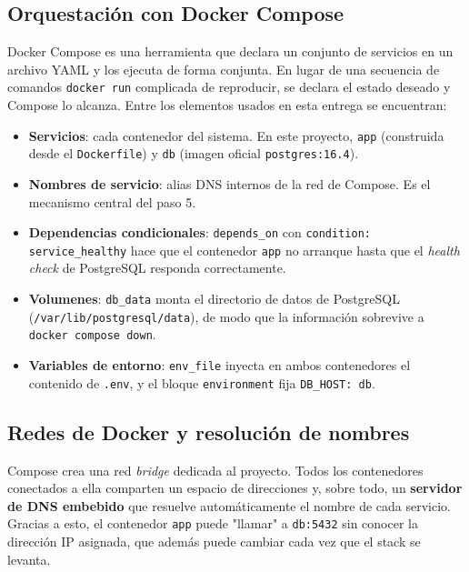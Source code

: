 \documentclass[12pt,a4paper]{article}
\begin{document}
\subsection{Orquestaci\'on con Docker Compose}

Docker Compose es una herramienta que declara un conjunto de servicios en un archivo YAML y
los ejecuta de forma conjunta. En lugar de una secuencia de comandos \texttt{docker run}
complicada de reproducir, se declara el estado deseado y Compose lo alcanza. Entre los
elementos usados en esta entrega se encuentran:

\begin{itemize}
  \item \textbf{Servicios}: cada contenedor del sistema. En este proyecto, \texttt{app}
        (construida desde el \texttt{Dockerfile}) y \texttt{db} (imagen oficial
        \texttt{postgres:16.4}).
  \item \textbf{Nombres de servicio}: alias DNS internos de la red de Compose. Es el
        mecanismo central del paso 5.
  \item \textbf{Dependencias condicionales}: \texttt{depends\_on} con
        \texttt{condition: service\_healthy} hace que el contenedor \texttt{app} no arranque
        hasta que el \emph{health check} de PostgreSQL responda correctamente.
  \item \textbf{Volumenes}: \texttt{db\_data} monta el directorio de datos de PostgreSQL
        (\texttt{/var/lib/postgresql/data}), de modo que la informaci\'on sobrevive a
        \texttt{docker compose down}.
  \item \textbf{Variables de entorno}: \texttt{env\_file} inyecta en ambos contenedores el
        contenido de \texttt{.env}, y el bloque \texttt{environment} fija \texttt{DB\_HOST: db}.
\end{itemize}

\subsection{Redes de Docker y resoluci\'on de nombres}

Compose crea una red \emph{bridge} dedicada al proyecto. Todos los contenedores conectados
a ella comparten un espacio de direcciones y, sobre todo, un \textbf{servidor de DNS
embebido} que resuelve autom\'aticamente el nombre de cada servicio. Gracias a esto, el
contenedor \texttt{app} puede "llamar" a \texttt{db:5432} sin conocer la direcci\'on IP
asignada, que adem\'as puede cambiar cada vez que el stack se levanta.
\end{document}

